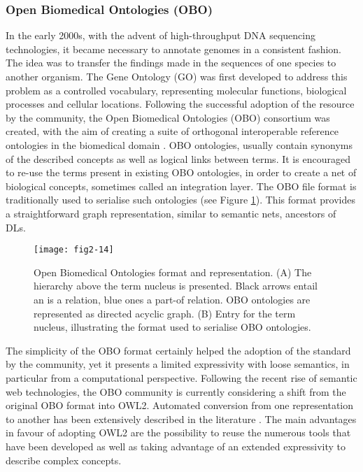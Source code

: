 \subsubsection{Open Biomedical Ontologies (OBO)}

In the early 2000s, with the advent of high-throughput DNA sequencing technologies, it became necessary to annotate genomes in a consistent fashion. The idea was to transfer the findings made in the sequences of one species to another organism. The Gene Ontology (GO) was first developed to address this problem \citep{ashburner2000gene} as a controlled vocabulary, representing molecular functions, biological processes and cellular locations. Following the successful adoption of the resource by the community, the Open Biomedical Ontologies (OBO) consortium was created, with the aim of creating a suite of orthogonal interoperable reference ontologies in the biomedical domain \citep{obofoundry}. OBO ontologies, usually contain synonyms of the described concepts as well as logical links between terms. It is encouraged to re-use the terms present in existing OBO ontologies, in order to create a net of biological concepts, sometimes called an integration layer. The OBO file format is traditionally used to serialise such ontologies (see Figure \ref{fig2-14}). This format provides a straightforward graph representation, similar to semantic nets, ancestors of DLs.

\begin{figure}[ht]
    \centering
    \texttt{[image: fig2-14]}
    \caption{Open Biomedical Ontologies format and representation. (A) The hierarchy above the term nucleus is presented. Black arrows entail an is a relation, blue ones a part-of relation. OBO ontologies are represented as directed acyclic graph. (B) Entry for the term nucleus, illustrating the format used to serialise OBO ontologies.}
    \label{fig2-14}
\end{figure}

The simplicity of the OBO format certainly helped the adoption of the standard by the community, yet it presents a limited expressivity with loose semantics, in particular from a computational perspective. Following the recent rise of semantic web technologies, the OBO community is currently considering a shift from the original OBO format into OWL2. Automated conversion from one representation to another has been extensively described in the literature \citep{tirmizi2011mapping} \citep{hoehndorf2010relations}. The main advantages in favour of adopting OWL2 are the possibility to reuse the numerous tools that have been developed as well as taking advantage of an extended expressivity to describe complex concepts.

